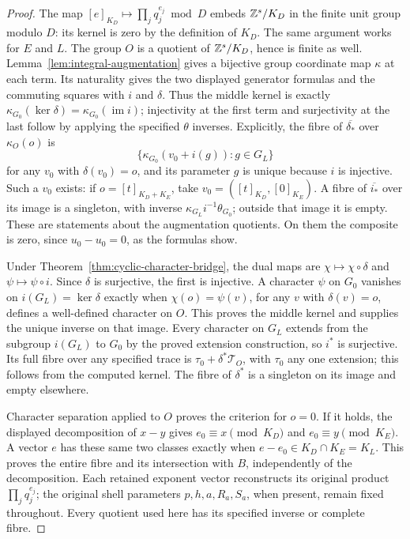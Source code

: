 \begin{proof}
The map \([e]_{K_D}\mapsto\prod_j q_j^{e_j}\bmod D\) embeds
\(\mathbb Z^s/K_D\) in the finite unit group modulo \(D\): its kernel
is zero by the definition of \(K_D\). The same argument works
for \(E\) and \(L\). The group \(O\) is a quotient of
\(\mathbb Z^s/K_D\), hence is finite as well.
Lemma~\ref{lem:integral-augmentation} gives a bijective group
coordinate map \(\kappa\) at each term. Its naturality gives
the two displayed generator formulas and the commuting squares
with \(i\) and \(\delta\). Thus the middle kernel is exactly
\(\kappa_{G_0}(\ker\delta)=\kappa_{G_0}(\operatorname{im}i)\);
injectivity at the first term and surjectivity at the last follow
by applying the specified \(\theta\) inverses. Explicitly, the fibre
of \(\overline{\delta_*}\) over \(\kappa_O(o)\) is
\[
 \{\kappa_{G_0}(v_0+i(g)):g\in G_L\}
\]
for any \(v_0\) with \(\delta(v_0)=o\), and its parameter \(g\)
is unique because \(i\) is injective. Such a \(v_0\) exists:
if \(o=[t]_{K_D+K_E}\), take
\(v_0=([t]_{K_D},[0]_{K_E})\). A fibre of
\(\overline{i_*}\) over its image is a singleton, with inverse
\(\kappa_{G_L}i^{-1}\theta_{G_0}\); outside that image it is empty.
These are statements about the augmentation quotients. On them the
composite is zero, since \(u_0-u_0=0\), as the formulas show.

Under Theorem~\ref{thm:cyclic-character-bridge}, the dual maps are
\(\chi\mapsto\chi\circ\delta\) and
\(\psi\mapsto\psi\circ i\). Since \(\delta\) is surjective,
the first is injective. A character \(\psi\) on \(G_0\)
vanishes on \(i(G_L)=\ker\delta\) exactly when
\(\chi(o)=\psi(v)\), for any \(v\) with \(\delta(v)=o\),
defines a well-defined character on \(O\). This proves the middle
kernel and supplies the unique inverse on that image. Every character
on \(G_L\) extends from the subgroup \(i(G_L)\) to \(G_0\)
by the proved extension construction, so \(i^*\) is surjective.
Its full fibre over any specified trace is
\(\tau_0+\delta^*\mathcal T_O\), with \(\tau_0\) any one
extension; this follows from the computed kernel. The fibre of
\(\delta^*\) is a singleton on its image and empty elsewhere.

Character separation applied to \(O\) proves the criterion for
\(o=0\). If it holds, the displayed decomposition of \(x-y\)
gives \(e_0\equiv x\pmod{K_D}\) and
\(e_0\equiv y\pmod{K_E}\). A vector \(e\) has these same
two classes exactly when
\(e-e_0\in K_D\cap K_E=K_L\). This proves the entire fibre
and its intersection with \(B\), independently of the decomposition.
Each retained exponent vector reconstructs its original product
\(\prod_jq_j^{e_j}\); the original shell parameters
\(p,h,a,R_a,S_a\), when present, remain fixed throughout.
Every quotient used here has its specified inverse or complete fibre.
\end{proof}
